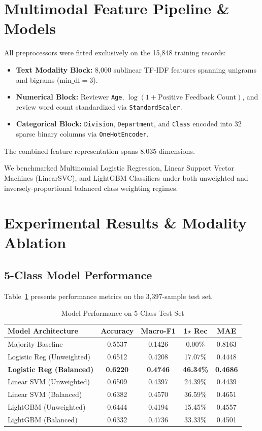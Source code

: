 \documentclass[conference]{IEEEtran}
\begin{document}
\section{Multimodal Feature Pipeline \& Models}
All preprocessors were fitted exclusively on the 15,848 training records:
\begin{itemize}
    \item \textbf{Text Modality Block:} 8,000 sublinear TF-IDF features spanning unigrams and bigrams ($\text{min\_df} = 3$).
    \item \textbf{Numerical Block:} Reviewer \texttt{Age}, $\log(1 + \text{Positive Feedback Count})$, and review word count standardized via \texttt{StandardScaler}.
    \item \textbf{Categorical Block:} \texttt{Division}, \texttt{Department}, and \texttt{Class} encoded into 32 sparse binary columns via \texttt{OneHotEncoder}.
\end{itemize}
The combined feature representation spans 8,035 dimensions.

We benchmarked Multinomial Logistic Regression, Linear Support Vector Machines (LinearSVC), and LightGBM Classifiers under both unweighted and inversely-proportional balanced class weighting regimes.

\section{Experimental Results \& Modality Ablation}
\subsection{5-Class Model Performance}
Table~\ref{tab:models} presents performance metrics on the 3,397-sample test set. 

\begin{table}[htbp]
\caption{Model Performance on 5-Class Test Set}
\label{tab:models}
\centering
\begin{tabular}{lcccc}
\toprule
\textbf{Model Architecture} & \textbf{Accuracy} & \textbf{Macro-F1} & \textbf{1$\star$ Rec} & \textbf{MAE} \\
\midrule
Majority Baseline & 0.5537 & 0.1426 & 0.00\% & 0.8163 \\
Logistic Reg (Unweighted) & 0.6512 & 0.4208 & 17.07\% & 0.4448 \\
\textbf{Logistic Reg (Balanced)} & \textbf{0.6220} & \textbf{0.4746} & \textbf{46.34\%} & \textbf{0.4686} \\
Linear SVM (Unweighted) & 0.6509 & 0.4397 & 24.39\% & 0.4439 \\
Linear SVM (Balanced) & 0.6382 & 0.4570 & 36.59\% & 0.4651 \\
LightGBM (Unweighted) & 0.6444 & 0.4194 & 15.45\% & 0.4557 \\
LightGBM (Balanced) & 0.6332 & 0.4736 & 33.33\% & 0.4501 \\
\bottomrule
\end{tabular}
\end{table}
\end{document}
